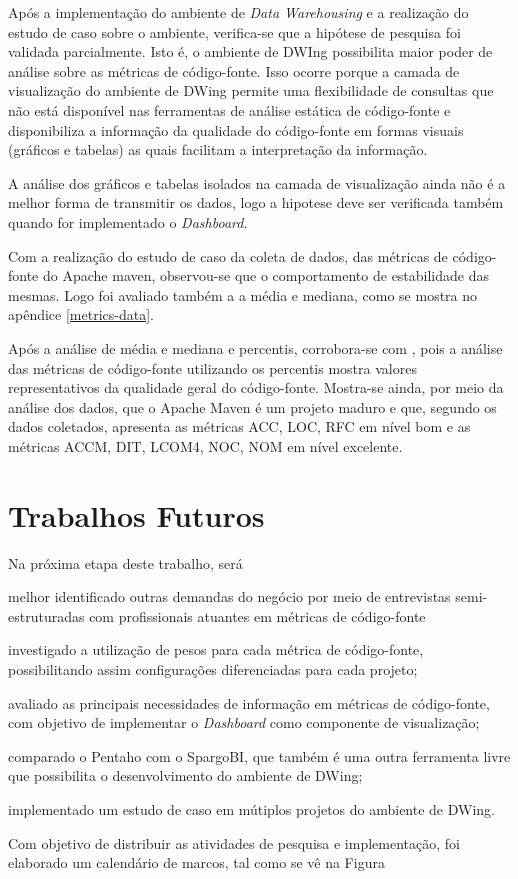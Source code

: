 Após a implementação do ambiente de \textit{Data Warehousing} e a realização do estudo de caso sobre o ambiente,  verifica-se que a hipótese de pesquisa foi validada parcialmente. Isto é, o ambiente de DWIng possibilita maior poder de análise sobre as métricas de código-fonte. Isso ocorre porque a camada de visualização do ambiente de DWing permite uma flexibilidade de consultas que não está disponível nas ferramentas de análise estática de código-fonte e disponibiliza a informação da qualidade do código-fonte em formas visuais (gráficos e tabelas) as quais facilitam a interpretação da informação.


A análise dos gráficos e tabelas isolados na camada de visualização ainda não é a melhor forma de transmitir os dados, logo a hipotese deve ser verificada também quando for implementado o \textit{Dashboard}. 


Com a realização do estudo de caso da coleta de dados, das métricas de código-fonte do Apache maven, observou-se que o comportamento de estabilidade das mesmas. Logo foi avaliado também a a média e mediana, como se mostra no apêndice \ref{metrics-data}.

Após a análise de média e mediana e percentis, corrobora-se com , pois a análise das métricas de código-fonte utilizando os percentis mostra valores representativos da qualidade geral do código-fonte. Mostra-se ainda, por meio da análise dos dados, que o Apache Maven é um projeto maduro e que, segundo os dados coletados, apresenta as métricas ACC, LOC, RFC em nível bom e as métricas ACCM, DIT, LCOM4, NOC, NOM em nível excelente.  



\section{Trabalhos Futuros}

Na próxima etapa deste trabalho, será \begin{inparaenum}[i)] \item melhor identificado outras demandas do negócio por meio de entrevistas semi-estruturadas com profissionais atuantes em métricas de código-fonte \item investigado a utilização de pesos para cada métrica de código-fonte, possibilitando assim configurações diferenciadas para cada projeto; \item avaliado as principais necessidades de informação em métricas de código-fonte, com objetivo de implementar o \textit{Dashboard} como componente de visualização; \item comparado o Pentaho com o SpargoBI, que também é uma outra ferramenta livre que possibilita o desenvolvimento do ambiente de DWing; \item implementado um estudo de caso em mútiplos projetos do ambiente de DWing. 
\end{inparaenum}
Com objetivo de distribuir as atividades de pesquisa e implementação, foi elaborado um calendário de marcos, tal como se vê na Figura

